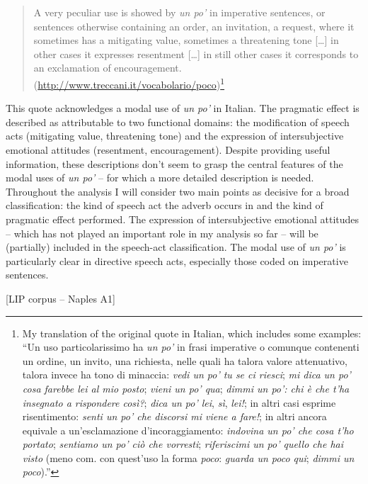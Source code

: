 \begin{quote}
A very peculiar use is showed by \textit{un po’} in imperative sentences, or sentences otherwise containing an order, an invitation, a request, where it sometimes has a mitigating value, sometimes a threatening tone […] in other cases it expresses resentment […] in still other cases it corresponds to an exclamation of encouragement. (\url{http://www.treccani.it/vocabolario/poco})\footnote{My translation of the original quote in Italian, which includes some examples: “Un uso particolarissimo ha \textit{un po’} in frasi imperative o comunque contenenti un ordine, un invito, una richiesta, nelle quali ha talora valore attenuativo, talora invece ha tono di minaccia: \textit{vedi un po’ tu se ci riesci}; \textit{mi dica un po’ cosa farebbe lei al mio posto}; \textit{vieni un po’ qua}; \textit{dimmi un po’: chi è che t’ha insegnato a rispondere così?}; \textit{dica un po’ lei}, \textit{sì}, \textit{lei!}; in altri casi esprime risentimento: \textit{senti un po’ che discorsi mi viene a fare!}; in altri ancora equivale a un’esclamazione d’incoraggiamento: \textit{indovina un po’ che cosa t’ho portato}; \textit{sentiamo un po’ ciò che vorresti}; \textit{riferiscimi un po’ quello che hai visto} (meno com. con quest’uso la forma \textit{poco}: \textit{guarda un poco qui}; \textit{dimmi un poco}).”}
\end{quote}

This quote acknowledges a modal use of \textit{un po’} in Italian. The pragmatic effect is described as attributable to two functional domains: the modification of speech acts (mitigating value, threatening tone) and the expression of intersubjective emotional attitudes (resentment, encouragement). Despite providing useful information, these descriptions don’t seem to grasp the central features of the modal uses of \textit{un po’} – for which a more detailed description is needed. Throughout the analysis I will consider two main points as decisive for a broad classification: the kind of speech act the adverb occurs in and the kind of pragmatic effect performed. The expression of intersubjective emotional attitudes – which has not played an important role in my analysis so far – will be (partially) included in the speech-act classification. The modal use of \textit{un po’} is particularly clear in directive speech acts, especially those coded on imperative sentences.

\ea%
    \label{ex:key:58}

          [LIP corpus – Naples A1]


